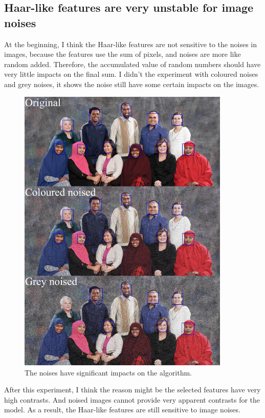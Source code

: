 \documentclass[10pt,twocolumn,letterpaper]{article}
\begin{document}
\subsection{Haar-like features are very unstable for image noises}
At the beginning, I think the Haar-like features are not sensitive to the noises in images,
because the features use the sum of pixels, and noises are more like random added.
Therefore, the accumulated value of random numbers should have very little impacts on the final sum.
I didn't the experiment with coloured noises and grey noises, it shows the noise still have some certain impacts on the images.

\begin{figure}
    \begin{center}
        \includegraphics[width=0.9\textwidth]{11people-noised}
    \end{center}
    \caption{The noises \cite{noise} have significant impacts on the algorithm.}
    \label{fig:tiltcor}
\end{figure}

After this experiment, I think the reason might be the selected features have very high contrasts.
And noised images cannot provide very apparent contrasts for the model.
As a result, the Haar-like features are still sensitive to image noises.
\end{document}
